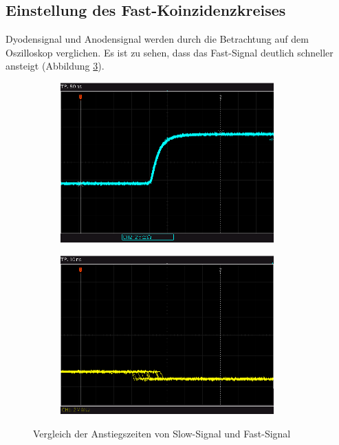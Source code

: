 \subsection{Einstellung des Fast-Koinzidenzkreises}
Dyodensignal und Anodensignal werden durch die Betrachtung auf dem Oszilloskop verglichen. Es ist zu sehen, dass das Fast-Signal deutlich schneller ansteigt (Abbildung \ref{fig:slow_fast}). \newpage
\begin{figure}[h]
  \centering
  \begin{subfigure}[h]{0.5\textwidth}
    \centering
    \includegraphics[width=0.9\textwidth]{data/oszi/anstiegszeit_slow.png}
    \label{fig:anstiegszeit_slow}
  \end{subfigure}%
  \begin{subfigure}[h]{0.5\textwidth}
    \centering
    \includegraphics[width=0.9\textwidth]{data/oszi/anstiegszeit_fast.png}
    \label{fig:anstiegszeit_fast}
  \end{subfigure}
  \caption{Vergleich der Anstiegszeiten von Slow-Signal und Fast-Signal}
  \label{fig:slow_fast}
\end{figure}

